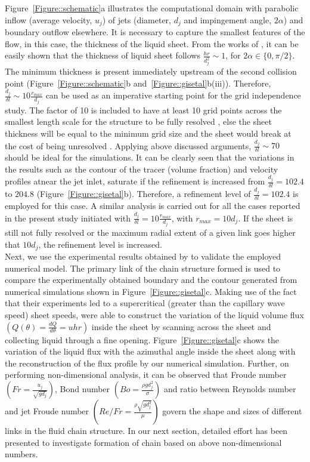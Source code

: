 \documentclass{jfm}
\begin{document}
Figure~\ref{Figure::schematic}a illustrates the computational domain with parabolic inflow (average velocity, $u_j$) of jets (diameter, $d_j$ and impingement angle, $2\alpha$) and boundary outflow elsewhere. It is necessary to capture the smallest features of the flow, in this case, the thickness of the liquid sheet. From the works of \cite{hasson1964thickness,poulikakos1998thickness,choo2001parametric}, it can be easily shown that the thickness of liquid sheet follows $\frac{hr}{d_j^2} \sim 1$, for $2\alpha \in \{0,\pi/2\}$. The minimum thickness is present immediately upstream of the second collision point (Figure~\ref{Figure::schematic}b and~\ref{Figure::gisetal}b(iii)). Therefore, $\frac{d_j}{\delta l} \sim 10\frac{r_{max}}{d_j}$ can be used as an imperative starting point for the grid independence study. The factor of 10 is included to have at least 10 grid points across the smallest length scale for the structure to be fully resolved \citep{ling2015multiscale}, else the sheet thickness will be equal to the minimum grid size and the sheet would break at the cost of being unresolved \citep{chen2013high}. Applying above discussed arguments, $\frac{d_j}{\delta l} \sim 70$ should be ideal for the simulations. It can be  clearly seen that the variations in the results such as the contour of the tracer (volume fraction) and velocity profiles atnear the jet inlet, saturate if the refinement is increased from $\frac{d_j}{\delta l} = 102.4$ to $204.8$ (Figure~\ref{Figure::gisetal}b). Therefore, a refinement level of $\frac{d_j}{\delta l} = 102.4$ is employed for this case. A similar analysis is carried out for all the cases reported in the present study initiated with $\frac{d_j}{\delta l} = 10\frac{r_{max}}{d_j}$, with $r_{max} = 10d_j$. If the sheet is still not fully resolved or the maximum radial extent of a given link goes higher that $10d_j$, the refinement level is increased.\\
Next, we use the experimental results obtained by \cite{bush2004collision} to validate the employed numerical model. The primary link of the chain structure formed is used to compare the experimentally obtained boundary and the contour generated from numerical simulations shown in Figure~\ref{Figure::gisetal}c. Making use of the fact that their experiments led to a supercritical (greater than the capillary wave speed) sheet speeds, \cite{bush2004collision} were able to construct the variation of the liquid volume flux $\left(Q(\theta) = \frac{dQ}{d\theta} = uhr\right)$ inside the sheet by scanning across the sheet and collecting liquid through a fine opening. Figure~\ref{Figure::gisetal}c shows the variation of the liquid flux with the azimuthal angle inside the sheet along with the reconstruction of the flux profile by our numerical simulation. Further, on performing non-dimensional analysis, it can be observed that Froude number $\left(Fr = \frac{u_j}{\sqrt{gd_j}}\right)$, Bond number $\left(Bo = \frac{\rho gd_j^2}{\sigma}\right)$ and ratio between Reynolds number and jet Froude number $\left(Re/Fr = \frac{\rho\sqrt{gd_j^3}}{\mu}\right)$ govern the shape and sizes of different links in the fluid chain structure. In our next section, detailed effort has been presented to investigate formation of chain based on above non-dimensional numbers.   
\end{document}
